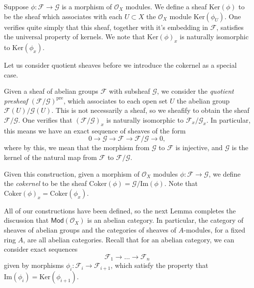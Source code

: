 \begin{example}
    Suppose $\phi: \mathcal{F} \to \mathcal{G}$ is a morphism of $\mathcal{O}_X$ modules. We define a sheaf $\text{Ker}(\phi)$ to be the sheaf which associates with each $U \subset X$ the $\mathcal{O}_X$ module $\text{Ker}(\phi_U)$. One verifies quite simply that this sheaf, together with it's embedding in $\mathcal{F}$, satisfies the universal property of kernels. We note that $\text{Ker}(\phi)_x$ is naturally isomorphic to $\text{Ker}(\phi_x)$.
\end{example}

Let us consider quotient sheaves before we introduce the cokernel as a special case.

\begin{example}
    Given a sheaf of abelian groups $\mathcal{F}$ with subsheaf $\mathcal{G}$, we consider the \emph{quotient presheaf} $(\mathcal{F}/\mathcal{G})^{\text{pre}}$, which associates to each open set $U$ the abelian group $\mathcal{F}(U)/\mathcal{G}(U)$. This is not necessarily a sheaf, so we sheafify to obtain the sheaf $\mathcal{F}/\mathcal{G}$. One verifies that $(\mathcal{F}/\mathcal{G})_x$ is naturally isomorphic to $\mathcal{F}_x / \mathcal{G}_x$. In particular, this means we have an exact sequence of sheaves of the form
    \[ 0 \to \mathcal{G} \to \mathcal{F} \to \mathcal{F}/\mathcal{G} \to 0, \]
    where by this, we mean that the morphism from $\mathcal{G}$ to $\mathcal{F}$ is injective, and $\mathcal{G}$ is the kernel of the natural map from $\mathcal{F}$ to $\mathcal{F}/\mathcal{G}$.
\end{example}

Given this construction, given a morphism of $\mathcal{O}_X$ modules $\phi: \mathcal{F} \to \mathcal{G}$, we define the \emph{cokernel} to be the sheaf $\text{Coker}(\phi) = \mathcal{G}/\text{Im}(\phi)$. Note that $\text{Coker}(\phi)_x = \text{Coker}(\phi_x)$.

All of our constructions have been defined, so the next Lemma completes the discussion that $\mathsf{Mod}(\mathcal{O}_X)$ is an abelian category. In particular, the category of sheaves of abelian groups and the categories of sheaves of $A$-modules, for a fixed ring $A$, are all abelian categories. Recall that for an abelian category, we can consider exact sequences
%
\[ \mathcal{F}_1 \to \dots \to \mathcal{F}_n \]
%
given by morphisms $\phi_i: \mathcal{F}_i \to \mathcal{F}_{i+1}$, which satisfy the property that $\text{Im}(\phi_i) = \text{Ker}(\phi_{i+1})$.

